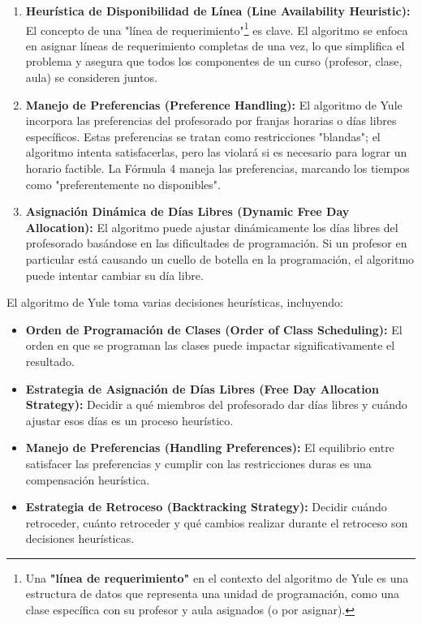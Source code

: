 \begin{enumerate}[label=\alph*.]
    \item \textbf{Heurística de Disponibilidad de Línea (Line Availability Heuristic):} El concepto de una "línea de requerimiento"\footnote{Una \textbf{"línea de requerimiento"} en el contexto del algoritmo de Yule es una estructura de datos que representa una unidad de programación, como una clase específica con su profesor y aula asignados (o por asignar).} es clave.
    El algoritmo se enfoca en asignar líneas de requerimiento completas de una vez, lo que simplifica el problema y asegura que todos los componentes de un curso (profesor, clase, aula) se consideren juntos.

    \item \textbf{Manejo de Preferencias (Preference Handling):} El algoritmo de Yule incorpora las preferencias del profesorado por franjas horarias o días libres específicos.
	Estas preferencias se tratan como restricciones "blandas"; el algoritmo intenta satisfacerlas, pero las violará si es necesario para lograr un horario factible.
	La Fórmula 4 maneja las preferencias, marcando los tiempos como "preferentemente no disponibles".

    \item \textbf{Asignación Dinámica de Días Libres (Dynamic Free Day Allocation):} El algoritmo puede ajustar dinámicamente los días libres del profesorado basándose en las dificultades de programación.
	Si un profesor en particular está causando un cuello de botella en la programación, el algoritmo puede intentar cambiar su día libre.
\end{enumerate}

El algoritmo de Yule toma varias decisiones heurísticas, incluyendo:

\begin{itemize}
    \item \textbf{Orden de Programación de Clases (Order of Class Scheduling):} El orden en que se programan las clases puede impactar significativamente el resultado.
    \item \textbf{Estrategia de Asignación de Días Libres (Free Day Allocation Strategy):} Decidir a qué miembros del profesorado dar días libres y cuándo ajustar esos días es un proceso heurístico.
    \item \textbf{Manejo de Preferencias (Handling Preferences):} El equilibrio entre satisfacer las preferencias y cumplir con las restricciones duras es una compensación heurística.
    \item \textbf{Estrategia de Retroceso (Backtracking Strategy):} Decidir cuándo retroceder, cuánto retroceder y qué cambios realizar durante el retroceso son decisiones heurísticas.
\end{itemize}

